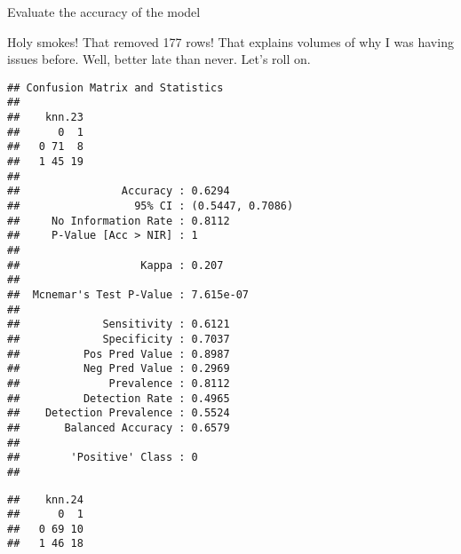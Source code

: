 \documentclass[
  ignorenonframetext,
]{beamer}
\newenvironment{Shaded}{\begin{snugshade}}{\end{snugshade}}
\newcommand{\FloatTok}[1]{\textcolor[rgb]{0.00,0.00,0.81}{#1}}
\newcommand{\FunctionTok}[1]{\textcolor[rgb]{0.00,0.00,0.00}{#1}}
\newcommand{\NormalTok}[1]{#1}
\newcommand{\SpecialCharTok}[1]{\textcolor[rgb]{0.00,0.00,0.00}{#1}}
\begin{document}
\begin{frame}[fragile]{Evaluate the accuracy of the model}
\begin{block}{Holy smokes! That removed 177 rows! That explains volumes
of why I was having issues before. Well, better late than never. Let's
roll on.}
\begin{verbatim}
## Confusion Matrix and Statistics
## 
##    knn.23
##      0  1
##   0 71  8
##   1 45 19
##                                           
##                Accuracy : 0.6294          
##                  95% CI : (0.5447, 0.7086)
##     No Information Rate : 0.8112          
##     P-Value [Acc > NIR] : 1               
##                                           
##                   Kappa : 0.207           
##                                           
##  Mcnemar's Test P-Value : 7.615e-07       
##                                           
##             Sensitivity : 0.6121          
##             Specificity : 0.7037          
##          Pos Pred Value : 0.8987          
##          Neg Pred Value : 0.2969          
##              Prevalence : 0.8112          
##          Detection Rate : 0.4965          
##    Detection Prevalence : 0.5524          
##       Balanced Accuracy : 0.6579          
##                                           
##        'Positive' Class : 0               
## 
\end{verbatim}

\begin{Shaded}
\end{Shaded}

\begin{verbatim}
##    knn.24
##      0  1
##   0 69 10
##   1 46 18
\end{verbatim}

\begin{Shaded}
\end{Shaded}


\end{block}
\end{frame}
\end{document}
